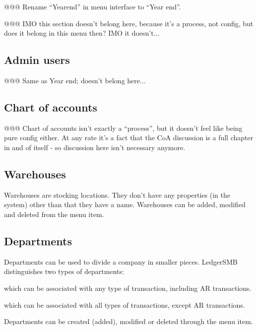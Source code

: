 @@@ Rename ``Yearend'' in menu interface to ``Year end''.


@@@ IMO this section doesn't belong here, because it's a process, not config, but does it belong in this menu then? IMO it doesn't...


\subsection{Admin users}
\label{subsec-company-config-admin-users}

@@@ Same as Year end; doesn't belong here...

\subsection{Chart of accounts}
\label{subsec-company-config-coa}

@@@ Chart of accounts isn't exactly a ``process'', but it doesn't feel like being pure
config either. At any rate it's a fact that the CoA discussion is a full chapter in and
of itself - so discussion here isn't necessary anymore.

\subsection{Warehouses}
\label{subsec-company-config-warehouses}

Warehouses are stocking locations. They don't have any properties (in the system)
other than that they have a name. Warehouses can be added, modified and deleted from
the  menu item.

\subsection{Departments}
\label{subsec-company-config-departments}

Departments can be used to divide a company in smaller pieces. LedgerSMB distinguishes two
types of departments:

\begin{description}[style=nextline]
\item [Profit centers] which can be associated with any type of transaction, including AR transactions.
\item [Cost centers] which can be associated with all types of transactions, except AR transactions.
\end{description}

Departments can be created (added), modified or deleted through the  menu item.

